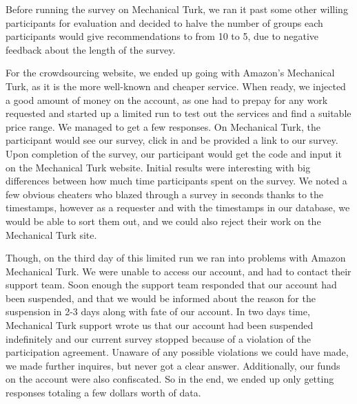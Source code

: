 Before running the survey on Mechanical Turk, we ran it past some other willing participants for evaluation and decided to halve the number of groups each participants would give recommendations to from 10 to 5, due to negative feedback about the length of the survey. 

For the crowdsourcing website, we ended up going with Amazon's Mechanical Turk, as it is the more well-known and cheaper service. When ready, we injected a good amount of money on the account, as one had to prepay for any work requested and started up a limited run to test out the services and find a suitable price range. We managed to get a few responses. On Mechanical Turk, the participant would see our survey, click in and be provided a link to our survey. Upon completion of the survey, our participant would get the code and input it on the Mechanical Turk website. Initial results were interesting with big differences between how much time participants spent on the survey. We noted a few obvious cheaters who blazed through a survey in seconds thanks to the timestamps, however as a requester and with the timestamps in our database, we would be able to sort them out, and we could also reject their work on the Mechanical Turk site.

Though, on the third day of this limited run we ran into problems with Amazon Mechanical Turk. We were unable to access our account, and had to contact their support team. Soon enough the support team responded that our account had been suspended, and that we would be informed about the reason for the suspension in 2-3 days along with fate of our account. In two days time, Mechanical Turk support wrote us that our account had been suspended indefinitely and our current survey stopped because of a violation of the participation agreement. Unaware of any possible violations we could have made, we made further inquires, but never got a clear answer. Additionally, our funds on the account were also confiscated. So in the end, we ended up only getting responses totaling a few dollars worth of data.

